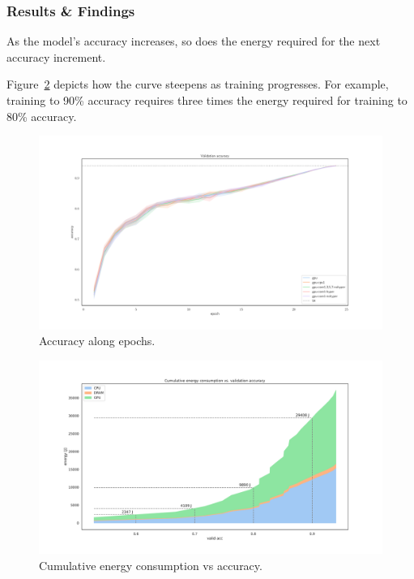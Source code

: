 \subsubsection{Results \& Findings}

As the model's accuracy increases, so does the energy required for the next accuracy increment.

Figure~\ref{fig:cum_energy_vs_accuracy} depicts how the curve steepens as training progresses.
For example, training to 90\% accuracy requires three times the energy required for training to 80\% accuracy.

\begin{figure}
    \centering
    \includegraphics[width=\linewidth]{imgs/accuracy_basedonepoch}
    \caption{Accuracy along epochs.}
    \label{fig:eopochvsaccuracy}
\end{figure}

\begin{figure}
    \centering
    \includegraphics[width=\linewidth]{imgs/cumulative_energy_vs_accuracy}
    \caption{Cumulative energy consumption vs accuracy.}
    \label{fig:cum_energy_vs_accuracy}
\end{figure}

